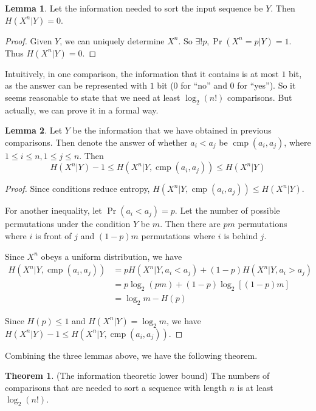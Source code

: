\documentclass[12pt]{extarticle}
\newcommand{\<}{\langle}
\renewcommand{\>}{\rangle}
\theoremstyle{definition}
\newtheorem{theorem}{Theorem}
\newtheorem{lemma}{Lemma}
\begin{document}
\begin{lemma}
	Let the information needed to sort the input sequence be $Y$. Then $H(X^n |Y) = 0$.
\end{lemma}
\begin{proof}
	Given $Y$, we can uniquely determine $X^n$. So $\exists !p, \operatorname{Pr} (X^n = p | Y) = 1$. Thus $H(X^n |Y) = 0$.
\end{proof}

Intuitively, in one comparison, the information that it contains is at most $1$ bit, as the answer can be represented with $1$ bit ($0$ for ``no'' and $0$ for ``yes''). So it seems reasonable to state that we need at least $\log_2 (n!)$ comparisons. But actually, we can prove it in a formal way. 

\begin{lemma}
	Let $Y$ be the information that we have obtained in previous comparisons. Then denote the answer of whether $a_i < a_j$ be $\operatorname{cmp}(a_i, a_j)$, where $1 \le i \le n, 1 \le j \le n$. Then 
	$$
	H(X^n | Y) - 1\le H(X^n | Y, \operatorname{cmp}(a_i, a_j)) \le H(X^n|Y)
	$$
\end{lemma}
\begin{proof}
	Since conditions reduce entropy, $H(X^n | Y, \operatorname{cmp}(a_i, a_j)) \le H(X^n|Y)$.
	
	For another inequality, let $\operatorname{Pr}(a_i < a_j) = p$. Let the number of possible permutations under the condition $Y$ be $m$. Then there are $pm$ permutations where $i$ is front of $j$ and $(1-p)m$ permutations where $i$ is behind $j$.
	
	Since $X^n$ obeys a uniform distribution, we have
	$$
	\begin{aligned}
	H(X^n | Y, \operatorname{cmp}(a_i, a_j)) &= pH(X^n | Y, a_i < a_j) + (1-p)H(X^n | Y, a_i > a_j) \\
	&= p \log_2 (pm) + (1-p)\log_2[(1 -p)m] \\
	&= \log_2 m - H(p)
	\end{aligned}
	$$
	
	Since $H(p) \le 1$ and $H(X^n | Y) = \log_2 m$, we have $H(X^n | Y) - 1\le H(X^n | Y, \operatorname{cmp}(a_i, a_j))$.
\end{proof}

Combining the three lemmas above, we have the following theorem.

\begin{theorem}
	(The information theoretic lower bound) The numbers of comparisons that are needed to sort a sequence with length $n$ is at least $\log_2 (n!)$.
\end{theorem} 
\end{document}
